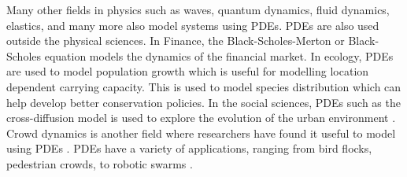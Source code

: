 Many other fields in physics such as waves, quantum dynamics, fluid dynamics, elastics, and many more also model systems using PDEs. PDEs are also used outside the physical sciences. In Finance, the Black-Scholes-Merton or Black-Scholes equation models the dynamics of the financial market. In ecology, PDEs are used to model population growth which is useful for modelling location dependent carrying capacity. This is used to model species distribution which can help develop better conservation policies. In the social sciences, PDEs such as the cross-diffusion model is used to explore the evolution of the urban environment \autocite{jinDetectingInteractionUrban2023}. Crowd dynamics is another field where researchers have found it useful to model using PDEs \autocite{mukherjeeLagrangianApproachModeling2015,hughesFlowLargeCrowds2000}. PDEs have a variety of applications, ranging from bird flocks, pedestrian crowds, to robotic swarms \autocite{gongCrowdDynamicsModeling2023}.

